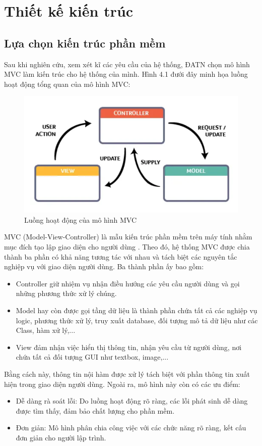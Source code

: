 \documentclass[../DoAn.tex]{subfiles}
\begin{document}
\section{Thiết kế kiến trúc}
\subsection{Lựa chọn kiến trúc phần mềm}
Sau khi nghiên cứu, xem xét kĩ các yêu cầu của hệ thống, ĐATN chọn mô hình MVC làm kiến trúc cho hệ thống của mình. Hình 4.1 đưới đây minh họa luồng hoạt động tổng quan của mô hình MVC:
\begin{figure}[H]
    \centering
    \includegraphics[width=0.65\linewidth]{Hinhve/MVC.png}
    \caption{Luồng hoạt động của mô hình MVC}
    \label{fig:Fig1}
\end{figure}

MVC (Model-View-Controller) là mẫu kiến trúc phần mềm trên máy tính nhằm mục đích tạo lập giao diện cho người dùng \cite{deacon2009model}. Theo đó, hệ thống MVC được chia thành ba phần có khả năng tương tác với nhau và tách biệt các nguyên tắc nghiệp vụ với giao diện người dùng. Ba thành phần ấy bao gồm:
\begin{itemize}
    \item Controller giữ nhiệm vụ nhận điều hướng các yêu cầu người dùng và gọi những phương thức xử lý chúng. 
    \item Model hay còn được gọi tầng dữ liệu là thành phần chứa tất cả các nghiệp vụ logic, phương thức xử lý, truy xuất database, đối tượng mô tả dữ liệu như các Class, hàm xử lý,...
    \item View đảm nhận việc hiển thị thông tin, nhận yêu cầu từ người dùng, nơi chứa tất cả đối tượng GUI như textbox, image,...
\end{itemize}
Bằng cách này, thông tin nội hàm được xử lý tách biệt với phần thông tin xuất hiện trong giao diện người dùng. Ngoài ra, mô hình này còn có các ưu điểm: 
\begin{itemize}
    \item Dễ dàng rà soát lỗi: Do luồng hoạt động rõ ràng, các lỗi phát sinh dễ dàng được tìm thấy, đảm bảo chất lượng cho phần mềm.
    \item Đơn giản: Mô hình phân chia công việc với các chức năng rõ ràng, kết cấu đơn giản cho người lập trình.
\end{itemize}
\newpage
\end{document}
